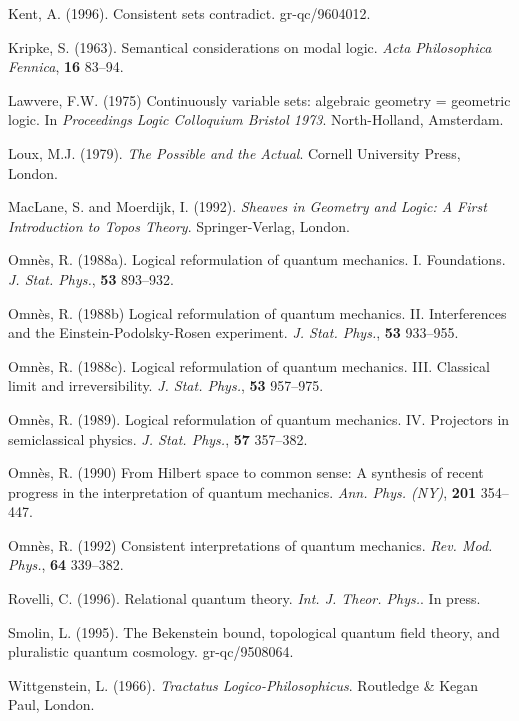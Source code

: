 \documentclass[12pt]{article}
\begin{document}
\begin{trivlist}
\item[] Kent, A. (1996). Consistent sets contradict. gr-qc/9604012.

\item[] Kripke, S. (1963). Semantical considerations on modal logic.
  {\em Acta Philosophica Fennica}, {\bf 16\/} 83--94.

\item[] Lawvere, F.W. (1975)
  Continuously variable sets: algebraic geometry = geometric logic.
  In {\em Proceedings Logic Colloquium Bristol 1973}.
  North-Holland, Amsterdam.

\item[] Loux, M.J. (1979). {\em The Possible and the Actual}.
  Cornell University Press, London.

\item[] Mac{L}ane, S. and Moerdijk, I. (1992).
  {\em Sheaves in Geometry and Logic: {A} First Introduction to Topos
  Theory}. Springer-Verlag, London.

\item[] Omn\`es, R. (1988a).
  Logical reformulation of quantum mechanics. {I.} {F}oundations.
  {\em J. Stat. Phys.}, {\bf 53} 893--932.

\item[] Omn\`es, R. (1988b)
  Logical reformulation of quantum mechanics. {II.} {I}nterferences and
  the {E}instein-{P}odolsky-{R}osen experiment.
  {\em J. Stat. Phys.}, {\bf 53} 933--955.

\item[] Omn\`es, R. (1988c).
  Logical reformulation of quantum mechanics. {III.} {C}lassical limit
  and irreversibility.  {\em J. Stat. Phys.}, {\bf 53} 957--975.

\item[] Omn\`es, R. (1989).
  Logical reformulation of quantum mechanics. {IV.} {P}rojectors in
  semiclassical physics.  {\em J. Stat. Phys.}, {\bf 57} 357--382.

\item[] Omn\`es, R. (1990)
  From {H}ilbert space to common sense: {A} synthesis of recent
  progress in the interpretation of quantum mechanics.
  {\em Ann. Phys. (NY)}, {\bf 201} 354--447.

\item[] Omn\`es, R. (1992)
  Consistent interpretations of quantum mechanics.
  {\em Rev. Mod. Phys.}, {\bf 64} 339--382.

\item[] Rovelli, C. (1996). Relational quantum theory.
  {\em Int. J. Theor. Phys.}. In press.

\item[] Smolin, L. (1995).
  The {B}ekenstein bound, topological quantum field theory, and
  pluralistic quantum cosmology.  gr-qc/9508064.

\item[] Wittgenstein, L. (1966). {\em Tractatus Logico-Philosophicus}.
  Routledge {\&} Kegan Paul, London.
\end{trivlist}
\end{document}
